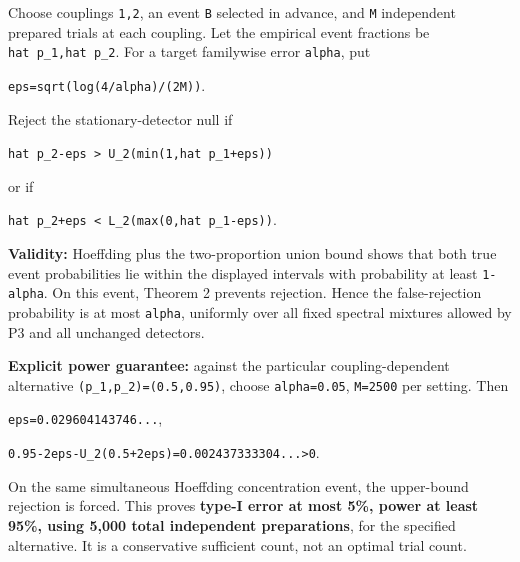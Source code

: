 \documentclass[
  10pt,
  a4paper,
]{article}
\begin{document}
Choose couplings \texttt{1,2}, an event \texttt{B} selected in advance, and \texttt{M} independent prepared trials at each coupling. Let the empirical event fractions be \texttt{hat\ p\_1,hat\ p\_2}. For a target familywise error \texttt{alpha}, put

\texttt{eps=sqrt(log(4/alpha)/(2M))}.

Reject the stationary-detector null if

\texttt{hat\ p\_2-eps\ \textgreater{}\ U\_2(min(1,hat\ p\_1+eps))}

or if

\texttt{hat\ p\_2+eps\ \textless{}\ L\_2(max(0,hat\ p\_1-eps))}.

\textbf{Validity:} Hoeffding plus the two-proportion union bound shows that both true event probabilities lie within the displayed intervals with probability at least \texttt{1-alpha}. On this event, Theorem 2 prevents rejection. Hence the false-rejection probability is at most \texttt{alpha}, uniformly over all fixed spectral mixtures allowed by P3 and all unchanged detectors.

\textbf{Explicit power guarantee:} against the particular coupling-dependent alternative \texttt{(p\_1,p\_2)=(0.5,0.95)}, choose \texttt{alpha=0.05}, \texttt{M=2500} per setting. Then

\texttt{eps=0.029604143746...},

\texttt{0.95-2eps-U\_2(0.5+2eps)=0.002437333304...\textgreater{}0}.

On the same simultaneous Hoeffding concentration event, the upper-bound rejection is forced. This proves \textbf{type-I error at most 5\%, power at least 95\%, using 5,000 total independent preparations}, for the specified alternative. It is a conservative sufficient count, not an optimal trial count.
\end{document}
